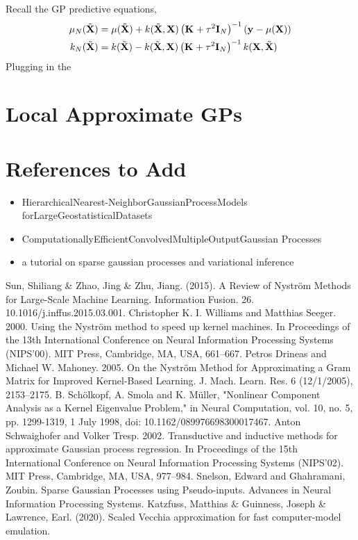 \documentclass[12pt]{article}
\begin{document}
Recall the GP predictive equations, 
\begin{align}
\GPMeanPred[\Ndesign](\predictMat) &= \GPMean(\predictMat) + \GPKer(\predictMat, \designMat) \left(\kerMat + \nugget^2 \I[\Ndesign] \right)^{-1} \left(\yObs - \GPMean(\designMat) \right) \\
\GPKerPred[\Ndesign](\predictMat) &= \GPKer(\predictMat) - \GPKer(\predictMat, \designMat) \left(\kerMat + \nugget^2 \I[\Ndesign] \right)^{-1} \GPKer(\designMat, \predictMat)
\end{align}
Plugging in the 




\section{Local Approximate GPs}

\section{References to Add}
\begin{itemize}
\item HierarchicalNearest-NeighborGaussianProcessModels forLargeGeostatisticalDatasets
\item ComputationallyEfficientConvolvedMultipleOutputGaussian Processes
\item a tutorial on sparse gaussian processes and variational inference
\end{itemize}


\begin{thebibliography}{20}
 Sun, Shiliang \& Zhao, Jing \& Zhu, Jiang. (2015). A Review of Nyström Methods for Large-Scale Machine Learning. Information Fusion. 26. 10.1016/j.inffus.2015.03.001. 
 Christopher K. I. Williams and Matthias Seeger. 2000. Using the Nyström method to speed up kernel machines. In Proceedings of the 13th International Conference on Neural Information Processing Systems (NIPS'00). MIT Press, Cambridge, MA, USA, 661–667.
 Petros Drineas and Michael W. Mahoney. 2005. On the Nyström Method for Approximating a Gram Matrix for Improved Kernel-Based Learning. J. Mach. Learn. Res. 6 (12/1/2005), 2153–2175.
 B. Schölkopf, A. Smola and K. Müller, "Nonlinear Component Analysis as a Kernel Eigenvalue Problem," in Neural Computation, vol. 10, no. 5, pp. 1299-1319, 1 July 1998, doi: 10.1162/089976698300017467.
 Anton Schwaighofer and Volker Tresp. 2002. Transductive and inductive methods for approximate Gaussian process regression. In Proceedings of the 15th International Conference on Neural Information Processing Systems (NIPS'02). MIT Press, Cambridge, MA, USA, 977–984.
 Snelson, Edward and Ghahramani, Zoubin. Sparse Gaussian Processes using Pseudo-inputs. Advances in Neural Information Processing Systems. %
 Katzfuss, Matthias & Guinness, Joseph & Lawrence, Earl. (2020). Scaled Vecchia approximation for fast computer-model emulation. 
\end{thebibliography}
\end{document}
